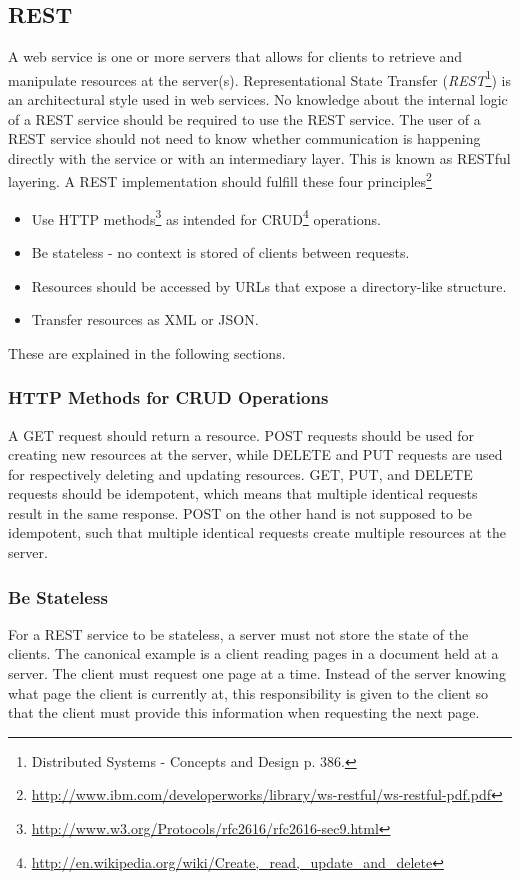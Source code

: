 \subsection{REST}
A web service is one or more servers that allows for clients to retrieve and manipulate resources at the server(s).  \newline
Representational State Transfer (\textit{REST}\footnote{Distributed Systems - Concepts and Design p. 386.}) is an architectural style used in web services. No knowledge about the internal logic of a REST service should be required to use the REST service. The user of a REST service should not need to know whether communication is happening directly with the service or with an intermediary layer. This is known as RESTful layering. \newline
A REST implementation should fulfill these four principles\footnote{\url{http://www.ibm.com/developerworks/library/ws-restful/ws-restful-pdf.pdf}} 

\begin{itemize}
\item Use HTTP methods\footnote{ \url{http://www.w3.org/Protocols/rfc2616/rfc2616-sec9.html}} as intended for CRUD\footnote{\url{http://en.wikipedia.org/wiki/Create,_read,_update_and_delete}} operations.
\item Be stateless - no context is stored of clients between requests. 
\item Resources should be accessed by URLs that expose a directory-like structure.
\item Transfer resources as XML or JSON.
\end{itemize}
These are explained in the following sections.

\subsubsection{HTTP Methods for CRUD Operations}
A GET request should return a resource. POST requests should be used for creating new resources at the server, while DELETE and PUT requests are used for respectively deleting and updating resources. GET, PUT, and DELETE requests should be idempotent, which means that multiple identical requests result in the same response. POST on the other hand is not supposed to be idempotent, such that multiple identical requests create multiple resources at the server.

\subsubsection{Be Stateless}
For a REST service to be stateless, a server must not store the state of the clients. The canonical example is a client reading pages in a document held at a server. The client must request one page at a time. Instead of the server knowing what page the client is currently at, this responsibility is given to the client so that the client must provide this information when requesting the next page. \\

